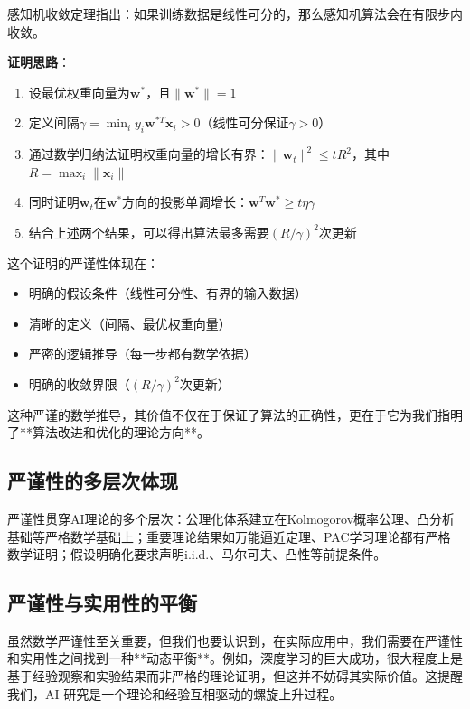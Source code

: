 感知机收敛定理指出：如果训练数据是线性可分的，那么感知机算法会在有限步内收敛。

\textbf{证明思路}：
\begin{enumerate}
\item 设最优权重向量为$\mathbf{w}^*$，且$\|\mathbf{w}^*\| = 1$
\item 定义间隔$\gamma = \min_i y_i \mathbf{w}^{*T}\mathbf{x}_i > 0$（线性可分保证$\gamma > 0$）
\item 通过数学归纳法证明权重向量的增长有界：$\|\mathbf{w}_t\|^2 \leq t R^2$，其中$R = \max_i \|\mathbf{x}_i\|$
\item 同时证明$\mathbf{w}_t$在$\mathbf{w}^*$方向的投影单调增长：$\mathbf{w}^T\mathbf{w}^* \geq t\eta\gamma$
\item 结合上述两个结果，可以得出算法最多需要$(R/\gamma)^2$次更新
\end{enumerate}

这个证明的严谨性体现在：
\begin{itemize}
\item 明确的假设条件（线性可分性、有界的输入数据）
\item 清晰的定义（间隔、最优权重向量）
\item 严密的逻辑推导（每一步都有数学依据）
\item 明确的收敛界限（$(R/\gamma)^2$次更新）
\end{itemize}

这种严谨的数学推导，其价值不仅在于保证了算法的正确性，更在于它为我们指明了**算法改进和优化的理论方向**。

\subsection*{严谨性的多层次体现}

严谨性贯穿AI理论的多个层次：公理化体系建立在Kolmogorov概率公理、凸分析基础等严格数学基础上；重要理论结果如万能逼近定理、PAC学习理论都有严格数学证明；假设明确化要求声明i.i.d.、马尔可夫、凸性等前提条件。

\subsection*{严谨性与实用性的平衡}

虽然数学严谨性至关重要，但我们也要认识到，在实际应用中，我们需要在严谨性和实用性之间找到一种**动态平衡**。例如，深度学习的巨大成功，很大程度上是基于经验观察和实验结果而非严格的理论证明，但这并不妨碍其实际价值。这提醒我们，AI 研究是一个理论和经验互相驱动的螺旋上升过程。


